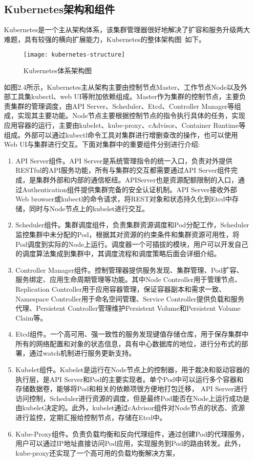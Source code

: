 \subsection{Kubernetes架构和组件}
Kubernetes是一个主从架构体系，该集群管理器很好地解决了扩容和服务升级两大难题，具有较强的横向扩展能力，Kubernetes的整体架构图~\cite{KUBdoc}如下。
\begin{figure}[H] %
	\centering
	\texttt{[image: kubernetes-structure]}
	\caption{Kubernetes体系架构图}
\end{figure}
如图2.4所示，Kubernetes主从架构主要由控制节点Master、工作节点Node以及外部工具集kubectl、web UI等附加依赖组成。Master作为集群的控制节点，主要负责集群的管理调度，由API Server、Scheduler、Etcd、Controller Manager等组成，实现其主要功能。Node节点主要根据控制节点的指令执行具体的任务，实现应用容器的运行，主要由kubelet、kube-proxy、cAdvisor、Container Runtime等组成。外部可以通过kubectl命令工具对集群进行增删查改的操作，也可以使用Web UI与集群进行交互。下面对集群中的重要组件分别进行介绍:
\begin{enumerate}[1.]
	\item  API Server组件。API Server是系统管理指令的统一入口，负责对外提供RESTful的API服务功能，所有与集群的交互都需要通过API Server组件完成，是集群外部和内部的通信枢纽。APIServer也是资源配额限制的入口，通过Authentication组件提供集群完备的安全认证机制。API Server接收外部Web browser或kubectl的命令请求，将REST对象和状态持久化到Etcd中存储，同时与Node节点上的kubelet进行交互。
	\item Scheduler组件。集群调度组件，负责集群资源调度和Pod分配工作，Scheduler监控集群中未分配的Pod，根据其对资源的约束条件和集群资源可用性，将Pod调度到实际的Node上运行。调度器一个可插拔的模块，用户可以开发自己的调度算法集成到集群中，其调度流程和调度策略后面会详细介绍。
	\item Controller Manager组件。控制管理器提供服务发现、集群管理、Pod扩容、服务绑定、应用生命周期管理等功能。其中Node Controller用于管理节点、Replication Controller用于应用容器管理，保证容器副本和需求一致、Namespace Controller用于命名空间管理、Service Controller提供负载和服务代理、Persistent Controller管理维护Persistent Volume和Persistent Volume Claim等。
	\item Etcd组件。一个高可用、强一致性的服务发现键值存储仓库，用于保存集群中所有的网络配置和对象的状态信息，具有中心数据库的地位，进行分布式的部署，通过watch机制进行服务更新支持。
	\item Kubelet组件。Kubelet是运行在Node节点上的控制器，用于裁决和驱动容器的执行层，是API Server和Pod的主要实现者。单个Pod中可以运行多个容器和存储数据卷，能够将Pod和相关的依赖项很方便地打包迁移，	API Server进行访问控制，Scheduler进行资源的调度，但是最终Pod能否在Node上运行成功是由kubelet决定的。此外，kubelet通过cAdvisor组件对Node节点的状态、资源进行监控，定期汇报给控制节点，存储在Etcd中。
	\item Kube-Proxy组件。负责负载均衡和反向代理组件，通过创建Pod的代理服务，用户可以通过IP地址直接访问Pod应用，实现服务到Pod的路由转发。此外，kube-proxy还实现了一个高可用的负载均衡解决方案，
\end{enumerate}

